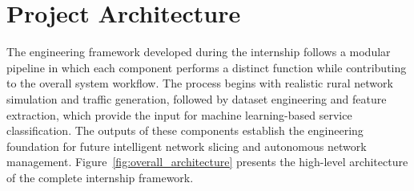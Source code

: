 \documentclass[12pt,a4paper]{report}
\begin{document}
	\section{Project Architecture}
	\label{sec:project_architecture}
	
	The engineering framework developed during the internship follows a modular pipeline in which each component performs a distinct function while contributing to the overall system workflow. The process begins with realistic rural network simulation and traffic generation, followed by dataset engineering and feature extraction, which provide the input for machine learning-based service classification. The outputs of these components establish the engineering foundation for future intelligent network slicing and autonomous network management. Figure~\ref{fig:overall_architecture} presents the high-level architecture of the complete internship framework.
	
\end{document}
